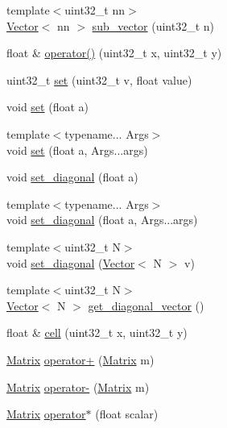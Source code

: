 \begin{DoxyCompactItemize}
\item 
{\footnotesize template$<$uint32\-\_\-t nn$>$ }\\\hyperlink{classetk_1_1_vector}{Vector}$<$ nn $>$ \hyperlink{classetk_1_1_matrix_a9415ca959acf61a1621bfdc5bcb56100}{sub\-\_\-vector} (uint32\-\_\-t n)
\item 
float \& \hyperlink{classetk_1_1_matrix_aad7af28437d15a1c278bcd6a241b2c96}{operator()} (uint32\-\_\-t x, uint32\-\_\-t y)
\item 
uint32\-\_\-t \hyperlink{classetk_1_1_matrix_a9a6d1b9c496122b0a08535beb3cd8155}{set} (uint32\-\_\-t v, float value)
\item 
void \hyperlink{classetk_1_1_matrix_a486b5fbb6db45e45f9999b79b24cd6da}{set} (float a)
\item 
{\footnotesize template$<$typename... Args$>$ }\\void \hyperlink{classetk_1_1_matrix_ab2d2e667b16b2d63dc2b46d8db3d516a}{set} (float a, Args...\-args)
\item 
void \hyperlink{classetk_1_1_matrix_a5e93de5c6c804680b5599610a845e2ac}{set\-\_\-diagonal} (float a)
\item 
{\footnotesize template$<$typename... Args$>$ }\\void \hyperlink{classetk_1_1_matrix_a0621c7eb5df433e05f5bf36ef0dc33f8}{set\-\_\-diagonal} (float a, Args...\-args)
\item 
{\footnotesize template$<$uint32\-\_\-t N$>$ }\\void \hyperlink{classetk_1_1_matrix_adba6f054bebc5f457e3b8ca10350c950}{set\-\_\-diagonal} (\hyperlink{classetk_1_1_vector}{Vector}$<$ N $>$ v)
\item 
{\footnotesize template$<$uint32\-\_\-t N$>$ }\\\hyperlink{classetk_1_1_vector}{Vector}$<$ N $>$ \hyperlink{classetk_1_1_matrix_a68fbc90828c19ae853c37da0413ee954}{get\-\_\-diagonal\-\_\-vector} ()
\item 
float \& \hyperlink{classetk_1_1_matrix_adc2f82946de711454e0404fcd0835dae}{cell} (uint32\-\_\-t x, uint32\-\_\-t y)
\item 
\hyperlink{classetk_1_1_matrix}{Matrix} \hyperlink{classetk_1_1_matrix_a465be428c62e36a4ab0d1112006e79bd}{operator+} (\hyperlink{classetk_1_1_matrix}{Matrix} m)
\item 
\hyperlink{classetk_1_1_matrix}{Matrix} \hyperlink{classetk_1_1_matrix_a820352c0703315ed72951067b4d65d72}{operator-\/} (\hyperlink{classetk_1_1_matrix}{Matrix} m)
\item 
\hyperlink{classetk_1_1_matrix}{Matrix} \hyperlink{classetk_1_1_matrix_aad071e58ccb5e1a2854bb46b42bace21}{operator$\ast$} (float scalar)

\end{DoxyCompactItemize}
